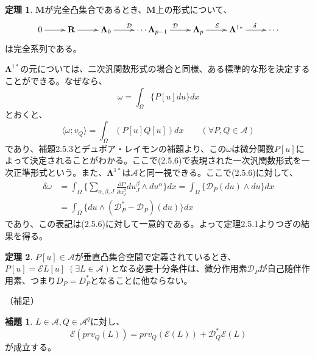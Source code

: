 \documentclass[a4paper, 11pt]{report}
\theoremstyle{definition}
\newtheorem{theorem}{定理}[section]
\newtheorem{lemma}{補題}[section]
\begin{document}
\begin{theorem}
 $\mathbf{M}$が完全凸集合であるとき、$\mathbf{M}$上の形式について、
\begin{align*}
\xymatrix{
0 \ar[r] &{\mathbf{R}} \ar[r] &{\mathbf{\Lambda}_0} \ar[r]^{\mathcal{D}} &{\cdots \mathbf{\Lambda}_{p-1}} \ar[r]^{\mathcal{D}} &{\mathbf{\Lambda}_p} \ar[r]^{\mathcal{E}} &{\mathbf{\Lambda}^{1*}} \ar[r]^{\delta} &{\cdots}
}
\end{align*}
は完全系列である。
\end{theorem}

 $\mathbf{\Lambda}^{1*}$の元については、二次汎関数形式の場合と同様、ある標準的な形を決定することができる。なぜなら、
\begin{equation}
\omega = \int_\Omega \{ P[u]du \} dx %
\end{equation}
とおくと、
\begin{equation*}
\langle \omega ;v_Q\rangle = \int_\Omega ( P[u]Q[u] ) dx\qquad (\forall P, Q \in \mathcal{A})
\end{equation*}
であり、補題2.5.3とデュボア・レイモンの補題より、この$\omega$は微分関数$P[u]$によって決定されることがわかる。ここで(2.5.6)で表現された一次汎関数形式を一次正準形式という。また、$\mathbf{\Lambda}^{1*}$は$\mathcal{A}$と同一視できる。ここで(2.5.6)に対して、
\begin{align*}
\delta \omega &= \int_\Omega \{ \sum _{\alpha,\beta,J} \frac{\partial P}{\partial u^\beta_J} du^\beta_J \wedge du^\alpha \} dx = \int_\Omega \{ \mathcal{D}_P (du) \wedge du \} dx \\
&= \int_\Omega \{ du \wedge (\mathcal{D}_{P}^* - \mathcal{D}_P ) (du) \} dx
\end{align*}
であり、この表記は(2.5.6)に対して一意的である。よって定理2.5.1よりつぎの結果を得る。

\begin{theorem}
 $P[u]\in \mathcal{A}$が垂直凸集合空間で定義されているとき、$P[u]=\mathcal{E}L[u]\; (\exists L\in \mathcal{A})$となる必要十分条件は、微分作用素$\mathcal{D}_P$が自己随伴作用素、つまり$D_P=D_{P}^*$となることに他ならない。
\end{theorem}

（補足）

\begin{lemma}
 $L\in \mathcal{A}, Q\in \mathcal{A}^q$に対し、
\begin{equation*}
\mathcal{E}(prv_Q(L)) = prv_Q(\mathcal{E}(L)) + \mathcal{D}_{Q}^* \mathcal{E}(L)
\end{equation*}
が成立する。
\end{lemma}
\end{document}
